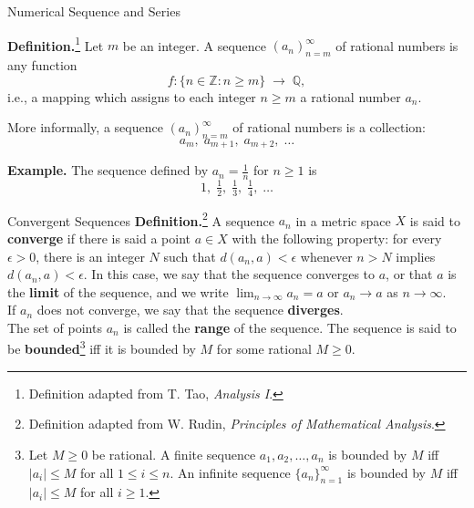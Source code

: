 \documentclass{beamer}
\begin{document}
\begin{frame}{Numerical Sequence and Series}

\textbf{Definition.}\footnote{Definition adapted from T. Tao, \emph{Analysis
I}.} Let $m$ be an integer.  
A sequence $(a_n)_{n=m}^{\infty}$ of rational numbers is any function
\[
f: \{ n \in \mathbb{Z} : n \geq m \} \;\to\; \mathbb{Q},
\]
i.e., a mapping which assigns to each integer $n \geq m$ a rational number
$a_n$.

\medskip
More informally, a sequence $(a_n)_{n=m}^{\infty}$ of rational numbers is a
collection:
\[
a_m, \; a_{m+1}, \; a_{m+2}, \; \dots
\]

\bigskip
\textbf{Example.}  
The sequence defined by $a_n = \tfrac{1}{n}$ for $n \geq 1$ is
\[
1, \; \tfrac{1}{2}, \; \tfrac{1}{3}, \; \tfrac{1}{4}, \; \dots
\]

    
\end{frame}

\begin{frame}{Convergent Sequences}
\textbf{Definition.}\footnote{Definition adapted from W. Rudin, \emph{Principles
of Mathematical Analysis}.} A sequence ${a_n}$ in a metric space $X$ is said to
\textbf{converge} if there is said a point $a \in X$ with the following
property: for every $\epsilon > 0$, there is an integer $N$ such that $d(a_n, a)
< \epsilon$ whenever $n > N$ implies $d(a_n,a)< \epsilon$.  In this case, we say
that the sequence converges to $a$, or that $a$ is the \textbf{limit} of the
sequence, and we write $\lim_{n \to \infty} a_n = a$ or $a_n \to a$ as $n \to
\infty$.\\ 
If ${a_n}$ does not converge, we say that the sequence \textbf{diverges}.\\ 

The set of points $a_n$ is called the \textbf{range} of the sequence. The
sequence is said to be \textbf{bounded}\footnote{Let $M \geq 0$ be rational.  A
finite sequence $a_1, a_2, \dotsc, a_n$ is bounded by $M$ iff $|a_i| \leq M$ for
all $1 \leq i \leq n$. An infinite sequence $\{a_n\}_{n=1}^{\infty}$ is bounded
by $M$ iff $|a_i| \leq M$ for all $i \geq 1$. } iff it is bounded by $M$ for
some rational $M \geq 0$. 
\end{frame}
\end{document}
